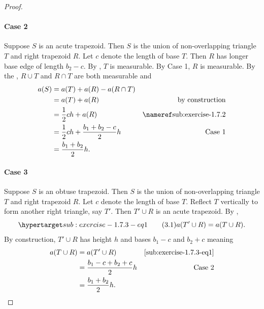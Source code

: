 \documentclass{report}
\begin{document}
\begin{proof}
    \paragraph{Case 2}%

      Suppose $S$ is an acute trapezoid.
      Then $S$ is the union of non-overlapping triangle $T$ and right trapezoid
        $R$.
      Let $c$ denote the length of base $T$.
      Then $R$ has longer base edge of length $b_2 - c$.
      By , $T$ is measurable.
      By Case 1, $R$ is measurable.
      By the , $R \cup T$ and $R \cap T$ are
        both measurable and
        \begin{align*}
          a(S)
            & = a(T) + a(R) - a(R \cap T) \\
            & = a(T) + a(R) & \text{by construction} \\
            & = \frac{1}{2}ch + a(R) & \textref{sub:exercise-1.7.2} \\
            & = \frac{1}{2}ch + \frac{b_1 + b_2 - c}{2}h & \text{Case 1} \\
            & = \frac{b_1 + b_2}{2}h.
        \end{align*}

    \paragraph{Case 3}%

      Suppose $S$ is an obtuse trapezoid.
      Then $S$ is the union of non-overlapping triangle $T$ and right trapezoid
        $R$.
      Let $c$ denote the length of base $T$.
      Reflect $T$ vertically to form another right triangle, say $T'$.
      Then $T' \cup R$ is an acute trapezoid.
      By ,
        \begin{equation}
          \hyperlabel{sub:exercise-1.7.3-eq1}
          \tag{3.1}
          a(T' \cup R) = a(T \cup R).
        \end{equation}
      By construction, $T' \cup R$ has height $h$ and bases $b_1 - c$ and
        $b_2 + c$ meaning
        \begin{align*}
          a(T \cup R)
            & = a(T' \cup R) & \eqref{sub:exercise-1.7.3-eq1} \\
            & = \frac{b_1 - c + b_2 + c}{2}h & \text{Case 2} \\
            & = \frac{b_1 + b_2}{2}h.
        \end{align*}


\end{proof}
\end{document}
